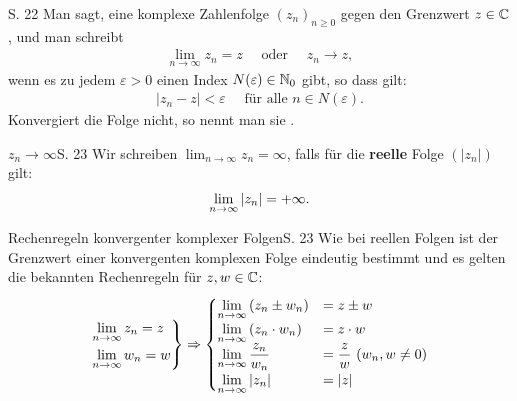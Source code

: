 \begin{definition}{S. 22}
  Man sagt, eine komplexe Zahlenfolge $\left( z_n \right)_{n \geq 0}$  gegen den Grenzwert $z \in \mathbb{C}$, und man schreibt
  \begin{align}
    \lim_{n \to \infty} z_n = z \quad \text{ oder } \quad z_n \to z ,
  \end{align}
  wenn es zu jedem $\varepsilon > 0$ einen Index $N(\varepsilon) \in \mathbb{N}_0$ gibt, so dass gilt:
  \begin{align}
    | z_n -z | < \varepsilon \quad \text{ für alle } n \in N(\varepsilon) .
  \end{align}
  Konvergiert die Folge nicht, so nennt man sie .
\end{definition}

\begin{bemerkung}{$z_n\to\infty$}{S. 23}
  Wir schreiben $\displaystyle\lim_{n \to \infty} z_n = \infty$, falls für die \textbf{reelle} Folge $\left( |z_n| \right)$ gilt:\\
  \begin{align}
    \displaystyle\lim_{n \to \infty} |z_n| = +\infty . \notag
  \end{align}
\end{bemerkung}

\begin{bemerkung}{Rechenregeln konvergenter komplexer Folgen}{S. 23}
  Wie bei reellen Folgen ist der Grenzwert einer konvergenten komplexen Folge eindeutig bestimmt und es gelten die bekannten Rechenregeln für $z, w \in \mathbb{C}$:
  \begin{align}
    \begin{rcases}
      \displaystyle \lim_{n \to \infty} z_n = z\\
      \displaystyle \lim_{n \to \infty} w_n = w
    \end{rcases}
    \Rightarrow
    \begin{cases}
      \displaystyle \lim_{n \to \infty} \left( z_n \pm w_n \right) &= z \pm w \\
      \displaystyle \lim_{n \to \infty} \left( z_n \cdot w_n \right) &= z \cdot w \\
      \displaystyle \lim_{n \to \infty} \frac{z_n}{w_n} &= \displaystyle \frac{z}{w} \ (w_n, w \neq 0) \\
      \displaystyle \lim_{n \to \infty} |z_n| &= |z|
    \end{cases}
  \end{align}
\end{bemerkung}
